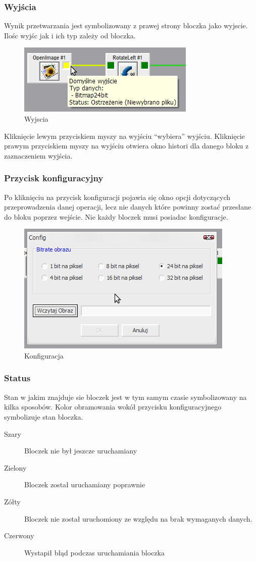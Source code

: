 \documentclass[a4paper,10pt]{article}
\begin{document}
\subsubsection{Wyjścia}
Wynik przetwarzania jest symbolizowany z prawej strony bloczka jako wyjscie. Ilośc wyjśc jak i ich typ zależy od bloczka.
\begin{figure}[h]
 \centering
 \includegraphics[scale=0.5]{wyjscia}
 \caption{Wyjscia}
 \label{fig:Output}
\end{figure}
Kliknięcie lewym przyciskiem myszy na wyjściu ``wybiera'' wyjściu.
Kliknięcie prawym przyciskiem myszy na wyjściu otwiera okno histori dla danego bloku z zaznaczeniem wyjścia.
\subsubsection{Przycisk konfiguracyjny}
Po kliknięciu na przycisk konfiguracji pojawia się okno opcji dotyczących przeprowadzenia danej operacji, lecz nie danych które powinny zostać przesłane do bloku poprzez wejście. Nie każdy bloczek musi posiadac konfiguracje.
\begin{figure}[h]
 \centering
 \includegraphics[scale=0.5]{config}
 \caption{Konfiguracja}
 \label{fig:config}
\end{figure} 
\subsubsection{Status}
Stan w jakim znajduje sie bloczek jest w tym samym czasie symbolizowany na kilka sposobów. Kolor obramowania wokół przycisku konfiguracyjnego symbolizuje stan bloczka.
\begin{description}
 \item[Szary] Bloczek nie był jeszcze uruchamiany
 \item[Zielony] Bloczek został uruchamiany poprawnie
 \item[Zółty] Bloczek nie został uruchomiony ze względu na brak wymaganych danych.
 \item[Czerwony] Wystapił błąd podczas uruchamiania bloczka
 \end{description}
\end{document}
